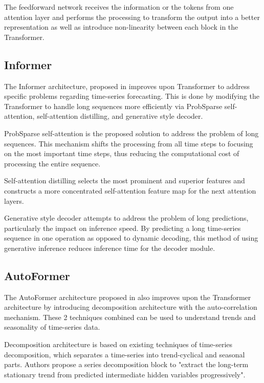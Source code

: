 \documentclass[conference]{IEEEtran}
\begin{document}
	The feedforward network receives the information or the tokens from one attention layer and performs the processing to transform the output into a better representation as well as introduce non-linearity between each block in the Transformer.
	
	\subsection{Informer}
	The Informer architecture, proposed in  \cite{zhou2021informer} improves upon Transformer to address specific problems regarding time-series forecasting. This is done by modifying the Transformer to handle long sequences more efficiently via ProbSparse self-attention, self-attention distilling, and generative style decoder.
	
	ProbSparse self-attention is the proposed solution to address the problem of long sequences.  This mechanism shifts the processing from all time steps to focusing on the most important time steps, thus reducing the computational cost of processing the entire sequence.
	
	Self-attention distilling selects the most prominent and superior features and constructs a more concentrated self-attention feature map for the next attention layers.
	
	Generative style decoder attempts to address the problem of long predictions, particularly the impact on inference speed.  By predicting a long time-series sequence in one operation as opposed to dynamic decoding, this method of using generative inference reduces inference time for the decoder module.
	
	\subsection{AutoFormer}
	The AutoFormer architecture proposed in \cite{wu2021autoformer} also improves upon the Transformer architecture by introducing decomposition architecture with the auto-correlation mechanism.  These 2 techniques combined can be used to understand trends and seasonality of time-series data.
	
	Decomposition architecture is based on existing techniques of time-series decomposition, which separates a time-series into trend-cyclical and seasonal parts.  Authors \cite{wu2021autoformer} propose a series decomposition block to "extract the long-term stationary trend from predicted intermediate hidden variables progressively".
	
\end{document}
